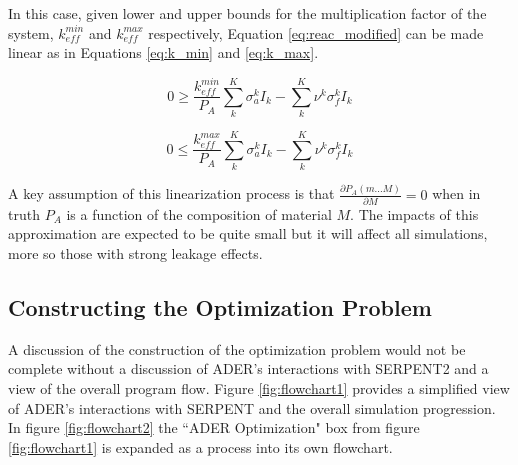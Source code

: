 In this case, given lower and upper bounds for the multiplication factor of 
the system, $k_{eff}^{min}$ and $k_{eff}^{max}$ respectively, 
Equation \ref{eq:reac_modified} can be made linear as in Equations 
\ref{eq:k_min} and \ref{eq:k_max}.


\begin{equation}
\label{eq:k_min}
0 \geq \frac{k_{eff}^{min}}{P_{A}} \sum \limits_{k}^{K} \sigma_{a}^{k} I_{k} 
- \sum \limits_{k}^{K} \nu^{k} \sigma_{f}^{k} I_{k}
\end{equation}

\begin{equation}
\label{eq:k_max}
0 \leq \frac{k_{eff}^{max}}{P_{A}} \sum \limits_{k}^{K} \sigma_{a}^{k} I_{k} 
- \sum \limits_{k}^{K} \nu^{k} \sigma_{f}^{k} I_{k}
\end{equation}

A key assumption of this linearization process is that 
$\frac{\partial P_{A}(m...M)}{\partial M} = 0$ when in truth
$P_{A}$ is a function of the composition of material $M$. The impacts of this 
approximation are expected to be quite small but it will affect all 
simulations, more so those with strong leakage effects.

\subsection{Constructing the Optimization Problem}\label{ssec:t_construct}
A discussion of the construction of the optimization problem would not be
complete without a discussion of ADER's interactions with SERPENT2 and a view
of the overall program flow. Figure \ref{fig:flowchart1} provides a simplified
view of ADER's interactions with SERPENT and the overall simulation progression.
In figure \ref{fig:flowchart2} the ``ADER Optimization" box from figure 
\ref{fig:flowchart1} is expanded as a process into its own flowchart.


